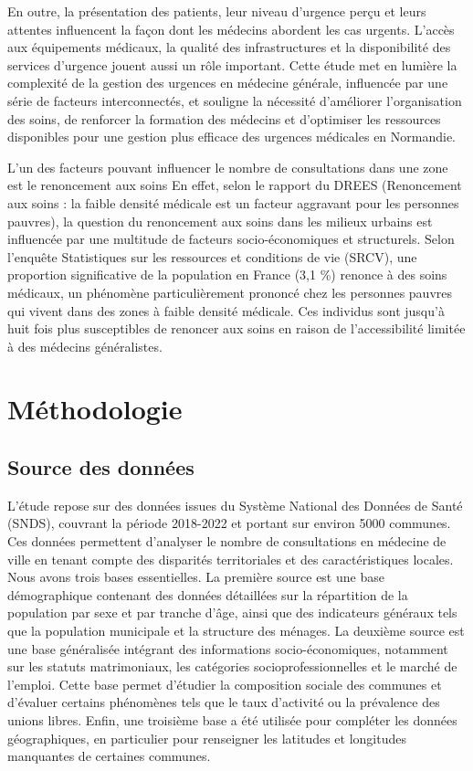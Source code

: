 \documentclass[
]{article}
\begin{document}
En outre, la présentation des patients, leur niveau d'urgence perçu et
leurs attentes influencent la façon dont les médecins abordent les cas
urgents. L'accès aux équipements médicaux, la qualité des
infrastructures et la disponibilité des services d'urgence jouent aussi
un rôle important. Cette étude met en lumière la complexité de la
gestion des urgences en médecine générale, influencée par une série de
facteurs interconnectés, et souligne la nécessité d'améliorer
l'organisation des soins, de renforcer la formation des médecins et
d'optimiser les ressources disponibles pour une gestion plus efficace
des urgences médicales en Normandie.

L'un des facteurs pouvant influencer le nombre de consultations dans une
zone est le renoncement aux soins En effet, selon le rapport du DREES
(Renoncement aux soins : la faible densité médicale est un facteur
aggravant pour les personnes pauvres), la question du renoncement aux
soins dans les milieux urbains est influencée par une multitude de
facteurs socio-économiques et structurels. Selon l'enquête Statistiques
sur les ressources et conditions de vie (SRCV), une proportion
significative de la population en France (3,1 \%) renonce à des soins
médicaux, un phénomène particulièrement prononcé chez les personnes
pauvres qui vivent dans des zones à faible densité médicale. Ces
individus sont jusqu'à huit fois plus susceptibles de renoncer aux soins
en raison de l'accessibilité limitée à des médecins généralistes.

\hypertarget{muxe9thodologie}{%
\section{Méthodologie}\label{muxe9thodologie}}

\hypertarget{source-des-donnuxe9es}{%
\subsection{Source des données}\label{source-des-donnuxe9es}}

L'étude repose sur des données issues du Système National des Données de
Santé (SNDS), couvrant la période 2018-2022 et portant sur environ 5000
communes. Ces données permettent d'analyser le nombre de consultations
en médecine de ville en tenant compte des disparités territoriales et
des caractéristiques locales. Nous avons trois bases essentielles. La
première source est une base démographique contenant des données
détaillées sur la répartition de la population par sexe et par tranche
d'âge, ainsi que des indicateurs généraux tels que la population
municipale et la structure des ménages. La deuxième source est une base
généralisée intégrant des informations socio-économiques, notamment sur
les statuts matrimoniaux, les catégories socioprofessionnelles et le
marché de l'emploi. Cette base permet d'étudier la composition sociale
des communes et d'évaluer certains phénomènes tels que le taux
d'activité ou la prévalence des unions libres. Enfin, une troisième base
a été utilisée pour compléter les données géographiques, en particulier
pour renseigner les latitudes et longitudes manquantes de certaines
communes.
\end{document}
